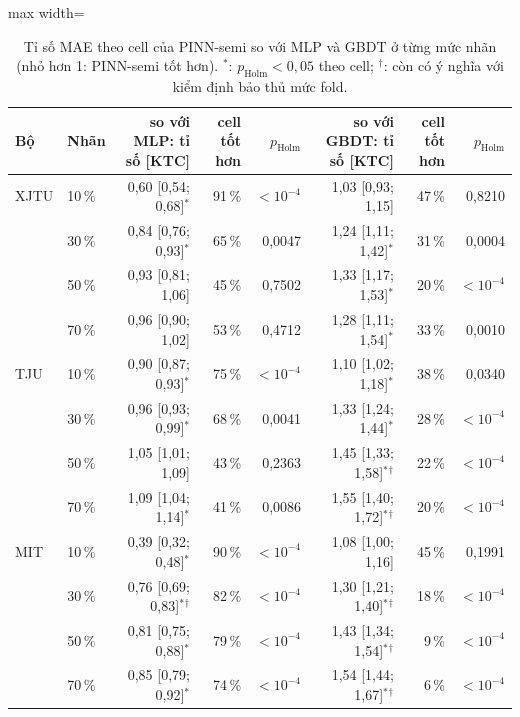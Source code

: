 \documentclass[12pt,a4paper,oneside]{report}
\theoremstyle{plain}
\theoremstyle{definition}
\begin{document}
\begin{table}[!htbp]\centering\scriptsize
\caption[Tỉ số MAE của PINN-semi so với MLP và GBDT]{Tỉ số MAE theo cell của PINN-semi so với MLP và GBDT ở từng mức nhãn (nhỏ hơn 1: PINN-semi tốt hơn). $^{*}$: $p_\text{Holm} < 0{,}05$ theo cell; $^{\dagger}$: còn có ý nghĩa với kiểm định bảo thủ mức fold.}\label{tab:cmp}
\begin{adjustbox}{max width=\textwidth}\begin{tabular}{llrrrrrr}\toprule
Bộ & Nhãn & so với MLP: tỉ số [KTC] & cell tốt hơn & $p_\text{Holm}$ & so với GBDT: tỉ số [KTC] & cell tốt hơn & $p_\text{Holm}$ \\\midrule
XJTU & 10\,\% & 0{,}60 [0{,}54; 0{,}68]$^{*}$ & 91\,\% & $<10^{-4}$ & 1{,}03 [0{,}93; 1{,}15] & 47\,\% & 0{,}8210 \\
 & 30\,\% & 0{,}84 [0{,}76; 0{,}93]$^{*}$ & 65\,\% & 0{,}0047 & 1{,}24 [1{,}11; 1{,}42]$^{*}$ & 31\,\% & 0{,}0004 \\
 & 50\,\% & 0{,}93 [0{,}81; 1{,}06] & 45\,\% & 0{,}7502 & 1{,}33 [1{,}17; 1{,}53]$^{*}$ & 20\,\% & $<10^{-4}$ \\
 & 70\,\% & 0{,}96 [0{,}90; 1{,}02] & 53\,\% & 0{,}4712 & 1{,}28 [1{,}11; 1{,}54]$^{*}$ & 33\,\% & 0{,}0010 \\
TJU & 10\,\% & 0{,}90 [0{,}87; 0{,}93]$^{*}$ & 75\,\% & $<10^{-4}$ & 1{,}10 [1{,}02; 1{,}18]$^{*}$ & 38\,\% & 0{,}0340 \\
 & 30\,\% & 0{,}96 [0{,}93; 0{,}99]$^{*}$ & 68\,\% & 0{,}0041 & 1{,}33 [1{,}24; 1{,}44]$^{*}$ & 28\,\% & $<10^{-4}$ \\
 & 50\,\% & 1{,}05 [1{,}01; 1{,}09] & 43\,\% & 0{,}2363 & 1{,}45 [1{,}33; 1{,}58]$^{*}$$^{\dagger}$ & 22\,\% & $<10^{-4}$ \\
 & 70\,\% & 1{,}09 [1{,}04; 1{,}14]$^{*}$ & 41\,\% & 0{,}0086 & 1{,}55 [1{,}40; 1{,}72]$^{*}$$^{\dagger}$ & 20\,\% & $<10^{-4}$ \\
MIT & 10\,\% & 0{,}39 [0{,}32; 0{,}48]$^{*}$ & 90\,\% & $<10^{-4}$ & 1{,}08 [1{,}00; 1{,}16] & 45\,\% & 0{,}1991 \\
 & 30\,\% & 0{,}76 [0{,}69; 0{,}83]$^{*}$$^{\dagger}$ & 82\,\% & $<10^{-4}$ & 1{,}30 [1{,}21; 1{,}40]$^{*}$$^{\dagger}$ & 18\,\% & $<10^{-4}$ \\
 & 50\,\% & 0{,}81 [0{,}75; 0{,}88]$^{*}$ & 79\,\% & $<10^{-4}$ & 1{,}43 [1{,}34; 1{,}54]$^{*}$$^{\dagger}$ & 9\,\% & $<10^{-4}$ \\
 & 70\,\% & 0{,}85 [0{,}79; 0{,}92]$^{*}$ & 74\,\% & $<10^{-4}$ & 1{,}54 [1{,}44; 1{,}67]$^{*}$$^{\dagger}$ & 6\,\% & $<10^{-4}$ \\

\end{tabular}
\end{adjustbox}
\end{table}
\end{document}
